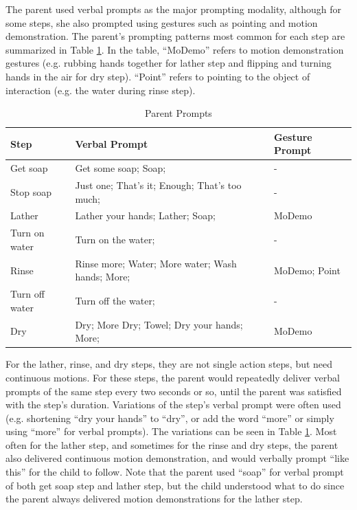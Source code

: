 The parent used verbal prompts as the major prompting modality, although for some steps, she also prompted using gestures such as pointing and motion demonstration.  The parent's prompting patterns most common for each step are summarized in Table \ref{tab:ParentPrompts}.  In the table, ``MoDemo'' refers to motion demonstration gestures (e.g. rubbing hands together for lather step and flipping and turning hands in the air for dry step).  ``Point'' refers to pointing to the object of interaction (e.g. the water during rinse step).

\begin{table}[H]
	\centering
	\begin{tabular}{ | l | l | l | }
		\hline
		\textbf{Step}	&	\textbf{Verbal Prompt} & \textbf{Gesture Prompt}	\\	\hline	\hline
		
		Get soap	&	Get some soap; Soap;	&	- 	\\	\hline
		Stop soap	&	Just one; That's it; Enough; That's too much;	&	-	\\ \hline
		Lather	&	Lather your hands; Lather; Soap;	& MoDemo	\\	\hline
		Turn on water	&	Turn on the water;	&	-	\\	\hline
		Rinse	&	Rinse more; Water; More water; Wash hands; More;	&	MoDemo; Point	\\	\hline
		Turn off water	&	Turn off the water;	&	-	\\	\hline
		Dry	&	Dry; More Dry; Towel; Dry your hands; More;	&	MoDemo	\\	\hline
		
	\end{tabular}
	\caption{Parent Prompts}
	\label{tab:ParentPrompts}
\end{table}

For the lather, rinse, and dry steps, they are not single action steps, but need continuous motions.  For these steps, the parent would repeatedly deliver verbal prompts of the same step every two seconds or so, until the parent was satisfied with the step's duration.  Variations of the step's verbal prompt were often used (e.g. shortening ``dry your hands'' to ``dry'', or add the word ``more'' or simply using ``more'' for verbal prompts).  The variations can be seen in Table \ref{tab:ParentPrompts}.  Most often for the lather step, and sometimes for the rinse and dry steps, the parent also delivered continuous motion demonstration, and would verbally prompt ``like this'' for the child to follow.  Note that the parent used ``soap'' for verbal prompt of both get soap step and lather step, but the child understood what to do since the parent always delivered motion demonstrations for the lather step.

